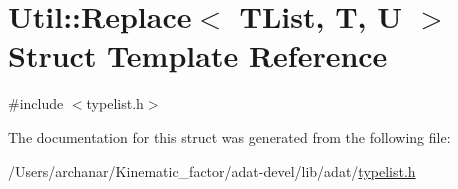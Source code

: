 \hypertarget{structUtil_1_1TL_1_1Replace}{}\section{Util\+:\+:Replace$<$ T\+List, T, U $>$ Struct Template Reference}
\label{structUtil_1_1TL_1_1Replace}


{\ttfamily \#include $<$typelist.\+h$>$}



The documentation for this struct was generated from the following file\+:\begin{DoxyCompactItemize}
\item 
/\+Users/archanar/\+Kinematic\+\_\+factor/adat-\/devel/lib/adat/\mbox{\hyperlink{adat-devel_2lib_2adat_2typelist_8h}{typelist.\+h}}\end{DoxyCompactItemize}
